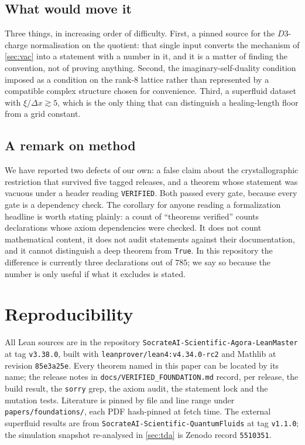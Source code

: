 \documentclass[11pt,a4paper]{article}
\theoremstyle{remark}
\begin{document}
\subsection*{What would move it}

Three things, in increasing order of difficulty. First, a pinned source for the $D3$-charge normalisation on the
quotient: that single input converts the mechanism of \cref{sec:vac} into a statement with a number in it, and it
is a matter of finding the convention, not of proving anything. Second, the imaginary-self-duality condition
imposed as a condition on the rank-$8$ lattice rather than represented by a compatible complex structure chosen
for convenience. Third, a superfluid dataset with $\xi/\Delta x\gtrsim5$, which is the only thing that can
distinguish a healing-length floor from a grid constant.

\subsection*{A remark on method}

We have reported two defects of our own: a false claim about the crystallographic restriction that survived five
tagged releases, and a theorem whose statement was vacuous under a header reading \texttt{VERIFIED}. Both passed
every gate, because every gate is a dependency check. The corollary for anyone reading a formalization headline
is worth stating plainly: a count of ``theorems verified'' counts declarations whose axiom dependencies were
checked. It does not count mathematical content, it does not audit statements against their documentation, and it
cannot distinguish a deep theorem from \texttt{True}. In this repository the difference is currently three
declarations out of $785$; we say so because the number is only useful if what it excludes is stated.

\section*{Reproducibility}

All Lean sources are in the repository \texttt{SocrateAI-Scientific-Agora-LeanMaster} at tag \texttt{v3.38.0},
built with \texttt{leanprover/lean4:v4.34.0-rc2} and Mathlib at revision \texttt{85e3a25e}. Every theorem named in
this paper can be located by its name; the release notes in \texttt{docs/VERIFIED\_FOUNDATION.md} record, per
release, the build result, the \texttt{sorry} grep, the axiom audit, the statement lock and the mutation tests.
Literature is pinned by file and line range under \texttt{papers/foundations/}, each PDF hash-pinned at fetch
time. The external superfluid results are from \texttt{SocrateAI-Scientific-QuantumFluids} at tag
\texttt{v1.1.0}; the simulation snapshot re-analysed in \cref{sec:tda} is Zenodo record \texttt{5510351}.
\end{document}
